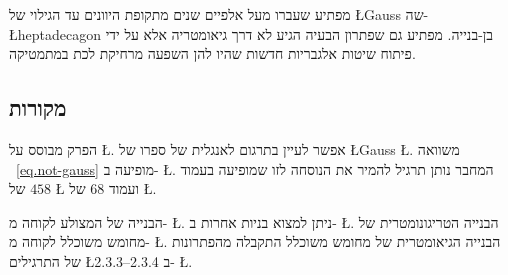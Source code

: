 מפתיע שעברו מעל אלפיים שנים מתקופת היוונים עד הגילוי של 
\L{Gauss}
שה-%
\L{heptadecagon}
בן-בנייה. מפתיע גם שפתרון הבעיה הגיע לא דרך גיאומטריה אלא על ידי פיתוח שיטות אלגבריות חדשות שהיו להן השפעה מרחיקת לכת במתמטיקה.

\subsection*{מקורות}

הפרק מבוסס על
\L{\cite{jorg}}.
אפשר לעיין בתרגום לאנגלית של ספרו של 
\L{Gauss}
\L{\cite{gauss}}.
משוואה%
~\ref{eq.not-gauss}
מופיעה ב-%
\L{\cite{rike}}.
המחבר נותן תרגיל להמיר את הנוסחה לזו שמופיעה בעמוד 
$458$
של
\L{\cite{gauss}}
ועמוד
$68$
של
\L{\cite{jorg}}.


הבנייה של המצולע לקוחה מ-%
\L{\cite{callagy}}.
ניתן למצוא בניות אחרות ב-%
\L{\cite{wiki:heptadecagon}}.
הבנייה הטריגונומטרית של מחומש משוכלל לקוחה מ-%
\L{\cite{wiki:pentagon}}.
הבנייה הגיאומטרית של מחומש משוכלל התקבלה מהפתרונות של התרגילים
\L{2.3.3--2.3.4}
ב-%
\L{\cite{stillwell}}.
